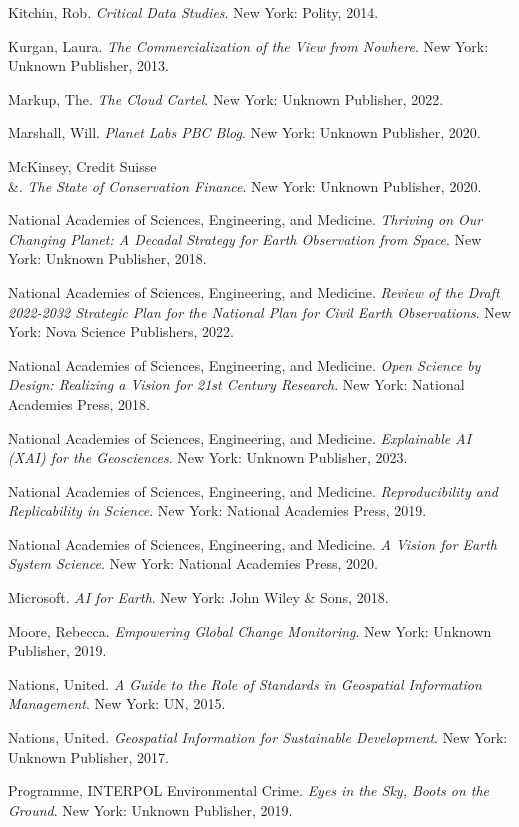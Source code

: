 \begin{hangparas}{0.15in}{1}
Kitchin, Rob. \t\textit{Critical Data Studies}. New York: Polity, 2014.

Kurgan, Laura. \t\textit{The Commercialization of the View from Nowhere}. New York: Unknown Publisher, 2013.

Markup, The. \t\textit{The Cloud Cartel}. New York: Unknown Publisher, 2022.

Marshall, Will. \t\textit{Planet Labs PBC Blog}. New York: Unknown Publisher, 2020.

McKinsey, Credit Suisse \\&. \t\textit{The State of Conservation Finance}. New York: Unknown Publisher, 2020.

National Academies of Sciences, Engineering, and Medicine. \t\textit{Thriving on Our Changing Planet: A Decadal Strategy for Earth Observation from Space}. New York: Unknown Publisher, 2018.

National Academies of Sciences, Engineering, and Medicine. \t\textit{Review of the Draft 2022-2032 Strategic Plan for the National Plan for Civil Earth Observations}. New York: Nova Science Publishers, 2022.

National Academies of Sciences, Engineering, and Medicine. \t\textit{Open Science by Design: Realizing a Vision for 21st Century Research}. New York: National Academies Press, 2018.

National Academies of Sciences, Engineering, and Medicine. \t\textit{Explainable AI (XAI) for the Geosciences}. New York: Unknown Publisher, 2023.

National Academies of Sciences, Engineering, and Medicine. \t\textit{Reproducibility and Replicability in Science}. New York: National Academies Press, 2019.

National Academies of Sciences, Engineering, and Medicine. \t\textit{A Vision for Earth System Science}. New York: National Academies Press, 2020.

Microsoft. \t\textit{AI for Earth}. New York: John Wiley & Sons, 2018.

Moore, Rebecca. \t\textit{Empowering Global Change Monitoring}. New York: Unknown Publisher, 2019.

Nations, United. \t\textit{A Guide to the Role of Standards in Geospatial Information Management}. New York: UN, 2015.

Nations, United. \t\textit{Geospatial Information for Sustainable Development}. New York: Unknown Publisher, 2017.

Programme, INTERPOL Environmental Crime. \t\textit{Eyes in the Sky, Boots on the Ground}. New York: Unknown Publisher, 2019.


\end{hangparas}

